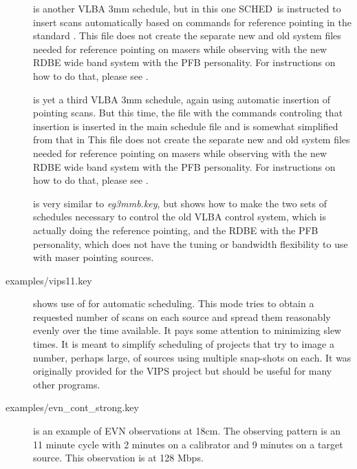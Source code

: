 \documentclass{report}
\newcommand{\schedb}{{\sc SCHED~}}
\begin{document}
\begin{description}
\item[] is
another VLBA 3mm schedule, but in this one \schedb is instructed to
insert  scans automatically
based on commands for reference pointing in the standard
.
This file does not create the separate new and old system files needed
for reference pointing on masers while observing with the new RDBE wide
band system with the PFB personality.  For instructions on how to do 
that, please see 
.

\item[] is
yet a third VLBA 3mm schedule, again using automatic insertion of
pointing scans.  But this time, the file with the commands controling
that insertion is inserted in the main schedule file and is somewhat
simplified from that in 
This file does not create the separate new and old system files needed
for reference pointing on masers while observing with the new RDBE wide
band system with the PFB personality.  For instructions on how to do 
that, please see 
.

\item[] 
is very similar to {\sl eg3mmb.key}, but shows how to make the two
sets of schedules necessary to control the old VLBA control system, 
which is actually doing the reference pointing, and the RDBE with the
PFB personality, which does not have the tuning or bandwidth flexibility 
to use with maser pointing sources.

\item[ {examples/vips11.key}]
shows use of  for automatic
scheduling.  This mode tries to obtain a requested number of scans on
each source and spread them reasonably evenly over the time available.
It pays some attention to minimizing slew times.  It is meant to
simplify scheduling of projects that try to image a number, perhaps
large, of sources using multiple snap-shots on each.  It was
originally provided for the VIPS project but should be useful for many
other programs.

\item[
{examples/evn\_cont\_strong.key}] is an example of EVN observations at
18cm.  The observing pattern is an 11 minute cycle with 2 minutes on
a calibrator and 9 minutes on a target source.  This observation is at
128 Mbps.


\end{description}
\end{document}
